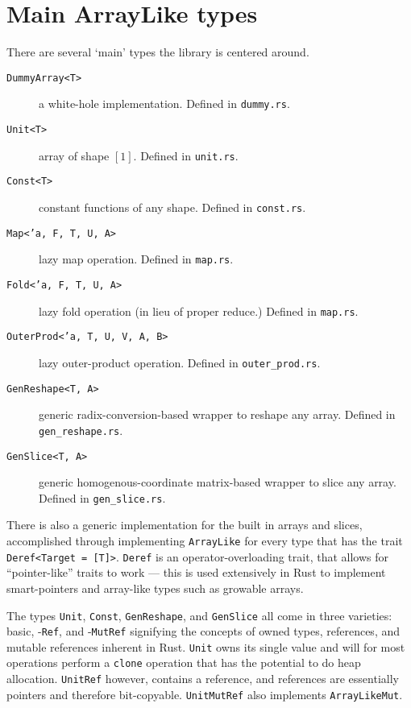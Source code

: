 \documentclass{DIKU-report-variant}
\begin{document}
\section{Main ArrayLike types}

There are several `main' types the library is centered around.
\begin{description}
  \item[\texttt{DummyArray<T>}] a white-hole implementation. Defined in \texttt{dummy.rs}.
  \item[\texttt{Unit<T>}] array of shape \([1]\). Defined in \texttt{unit.rs}.
  \item[\texttt{Const<T>}] constant functions of any shape. Defined in \texttt{const.rs}.
  \item[\texttt{Map<'a, F, T, U, A>}] lazy map operation. Defined in \texttt{map.rs}.
  \item[\texttt{Fold<'a, F, T, U, A>}] lazy fold operation (in lieu of proper reduce.) Defined in \texttt{map.rs}.
  \item[\texttt{OuterProd<'a, T, U, V, A, B>}] lazy outer-product operation. Defined in \texttt{outer\_prod.rs}.
  \item[\texttt{GenReshape<T, A>}] generic radix-conversion-based wrapper to reshape any array. Defined in \texttt{gen\_reshape.rs}.
  \item[\texttt{GenSlice<T, A>}] generic homogenous-coordinate matrix-based wrapper to slice any array. Defined in \texttt{gen\_slice.rs}.
\end{description}

There is also a generic implementation for the built in arrays and slices, accomplished through
implementing \texttt{ArrayLike} for every type that has the trait \texttt{Deref<Target = [T]>}.
\texttt{Deref} is an operator-overloading trait, that allows for ``pointer-like'' traits to
work --- this is used extensively in Rust to implement smart-pointers and array-like types such
as growable arrays.

The types \texttt{Unit}, \texttt{Const}, \texttt{GenReshape}, and \texttt{GenSlice} all come in
three varieties: basic, -\texttt{Ref}, and -\texttt{MutRef} signifying the concepts of owned types,
references, and mutable references inherent in Rust. \texttt{Unit} owns its single value and will
for most operations  perform a \texttt{clone} operation that has the potential to do heap allocation.
\texttt{UnitRef} however, contains a reference, and references are essentially pointers and therefore
bit-copyable. \texttt{UnitMutRef} also implements \texttt{ArrayLikeMut}.
\end{document}
